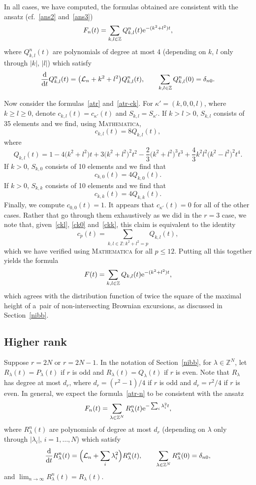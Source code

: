 \documentclass[pdftex]{sigma}
\theoremstyle{definition}
\newcommand\Z{{\mathbb Z}}
\newcommand\cL{{\mathcal L}}
\begin{document}
In all cases, we have computed, the formulas obtained are consistent with the ansatz (cf.\ \eqref{ans2} and~\eqref{ans3})
\[
F_n(t)=\sum_{k,l\in\Z} Q^n_{k,l}(t) {\rm e}^{-(k^2+l^2)t},
\]
where $Q^n_{k,l}(t)$ are polynomials of degree at most 4 (depending on $k$, $l$ only through $|k|$, $|l|$)
which satisfy
\[\frac{\rm d}{{\rm d}t} Q^n_{k,l}(t) = \big(\cL_n+k^2+l^2\big) Q^n_{k,l}(t),\qquad \sum_{k,l\in\Z} Q^n_{k,l}(0)=\delta_{n0}. \]

Now consider the formulas~\eqref{atr} and~\eqref{atr-ck}.
For $\kappa'=(k,0,0,l)$, where $k\ge l\ge 0$, denote $c_{k,l}(t)=c_{\kappa'}(t)$ and $S_{k,l}=S_{\kappa'}$.
If $k>l>0$, $S_{k,l}$ consists of 35 elements and we find, using \textsc{Mathematica},
\begin{equation}\label{ckl} c_{k,l}(t)=8Q_{k,l}(t),\end{equation}
where
\[
Q_{k,l}(t) = 1 - 4\big(k^2+l^2\big) t + 3\big(k^2+l^2\big)^2t^2
 -\frac23\big(k^2+l^2\big)^3t^3+\frac43 k^2l^2\big(k^2-l^2\big)^2 t^4.\]
If $k>0$, $S_{k,0}$ consists of 10 elements and we find that
\begin{equation}\label{ck0} c_{k,0}(t)=4Q_{k,0}(t).\end{equation}
If $k>0$, $S_{k,k}$ consists of 10 elements and we find that
\begin{equation}\label{ckk} c_{k,k}(t)=4Q_{k,k}(t).\end{equation}
Finally, we compute $c_{0,0}(t)=1$.
It appears that $c_{\kappa'}(t)=0$ for all of the other cases. Rather that go through them exhaustively
as we did in the $r=3$ case,
we note that, given~\eqref{ckl}, \eqref{ck0} and~\eqref{ckk}, this claim is equivalent to the identity
\begin{equation}\label{cp-Q} c_p(t)=\sum_{k,l\in\Z\colon k^2+l^2=p} Q_{k,l}(t),\end{equation}
which we have verified using \textsc{Mathematica} for all $p\le 12$.
Putting all this together yields the formula
\[
F( t) = \sum_{k,l\in\Z} Q_{k,l}(t) {\rm e}^{-(k^2+l^2)t},
\]
which agrees with the distribution function of twice
the square of the maximal height of a~pair of non-intersecting Brownian excursions,
as discussed in Section~\ref{nibb}.

\subsection{Higher rank}

Suppose $r=2N$ or $r=2N-1$. In the notation of Section~\ref{nibb}, for $\lambda\in\Z^N$, let $R_\lambda(t)=P_\lambda(t)$ if $r$ is odd
and $R_\lambda(t)=Q_\lambda(t)$ if $r$ is even. Note that $R_\lambda$ has degree at most $d_r$, where $d_r=(r^2-1)/4$ if $r$ is odd
and $d_r=r^2/4$ if $r$ is even.
In general, we expect the formula~\eqref{atr-n} to be consistent with the ansatz
\[
F_n(t)=\sum_{\lambda\in\Z^N} R^n_{\lambda}(t) {\rm e}^{-\sum_i \lambda_i^2t},
\]
where $R^n_{\lambda}(t)$ are polynomials of degree at most $d_r$ (depending on $\lambda$ only through $|\lambda_i|$, $i=1,\dots,N$)
which satisfy
\[\frac{\rm d}{{\rm d}t} R^n_{\lambda}(t) = \Big(\cL_n+\sum_i \lambda_i^2\Big) R^n_{\lambda}(t),\qquad \sum_{\lambda\in\Z^N} R^n_{\lambda}(0)=\delta_{n0}, \]
and $\lim_{n\to\infty}R^n_{\lambda}(t) =R_{\lambda}(t)$.
\end{document}
